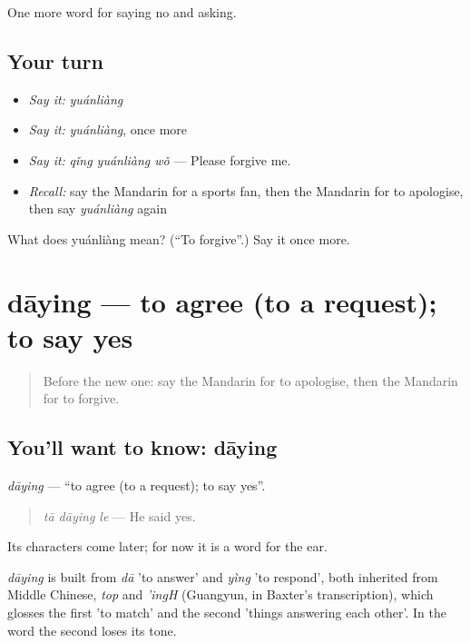 \begin{grammarlens}[title={What you've built}]
One more word for saying no and asking.
\end{grammarlens}

\subsection*{Your turn}
\begin{itemize}
\raggedright
  \item \emph{Say it:} \emph{yuánliàng}
  \item \emph{Say it:} \emph{yuánliàng}, once more
  \item \emph{Say it:} \emph{qǐng yuánliàng wǒ} — Please forgive me.
  \item \emph{Recall:} say the Mandarin for a sports fan, then the Mandarin for to apologise, then say \emph{yuánliàng} again
\end{itemize}

\begin{tcolorbox}[breakable,colback=teal!4,colframe=teal!35!black,title={Before you move on}]
What does yuánliàng mean? (\textquotedblleft{}To forgive\textquotedblright{}.) Say it once more.
\end{tcolorbox}
\section[dāying]{dāying — to agree (to a request); to say yes}

\label{lesson:ZH-C275-daying}



\begin{quote}
Before the new one: say the Mandarin for to apologise, then the Mandarin for to forgive.
\end{quote}

\subsection*{You'll want to know: dāying}
\emph{dāying} — \textquotedblleft{}to agree (to a request); to say yes\textquotedblright{}.

\begin{quote}
\emph{tā dāying le} — He said yes.
\end{quote}

Its characters come later; for now it is a word for the ear.

\begin{cousinweb}
\emph{dāying} is built from \emph{dā} 'to answer' and \emph{yìng} 'to respond', both inherited from Middle Chinese, \emph{top} and \emph{'ingH} (Guangyun, in Baxter's transcription), which glosses the first 'to match' and the second 'things answering each other'. In the word the second loses its tone.
\end{cousinweb}

